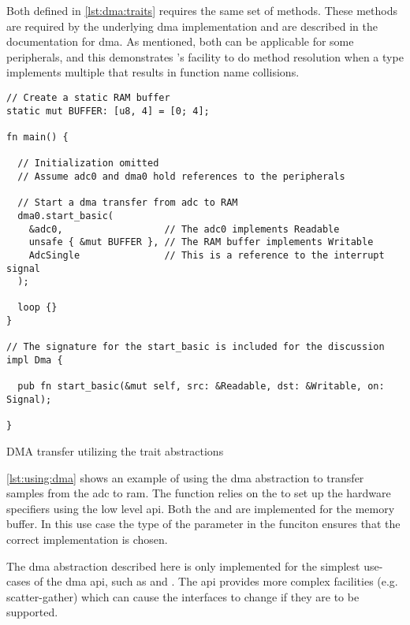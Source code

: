 Both  defined in \autoref{lst:dma:traits} requires the same set of methods.
These methods are required by the underlying \gls{dma} implementation and are described in the {\emlib} documentation for \gls{dma}.
As mentioned, both  can be applicable for some peripherals, and this demonstrates {\rust}'s facility to do method resolution when a type implements multiple  that results in function name collisions.

\begin{listing}[H]
  \begin{verbatim}
// Create a static RAM buffer
static mut BUFFER: [u8, 4] = [0; 4];

fn main() {

  // Initialization omitted
  // Assume adc0 and dma0 hold references to the peripherals

  // Start a dma transfer from adc to RAM
  dma0.start_basic(
    &adc0,                  // The adc0 implements Readable
    unsafe { &mut BUFFER }, // The RAM buffer implements Writable
    AdcSingle               // This is a reference to the interrupt signal
  );

  loop {}
}

// The signature for the start_basic is included for the discussion
impl Dma {

  pub fn start_basic(&mut self, src: &Readable, dst: &Writable, on: Signal);

}
  \end{verbatim}
  \caption{DMA transfer utilizing the trait abstractions}
  \label{lst:using:dma}
\end{listing}

\autoref{lst:using:dma} shows an example of using the \gls{dma} abstraction to transfer samples from the \gls{adc} to \gls{ram}.
The  function relies on the  to set up the hardware specifiers using the low level \gls{api}.
Both the  and   are implemented for the memory buffer.
In this use case the type of the  parameter in the  funciton ensures that the correct implementation is chosen.

The \gls{dma} abstraction described here is only implemented for the simplest use-cases of the {\emlib} \gls{dma} \gls{api}, such as  and .
The {\emlib} \gls{api} provides more complex facilities (e.g. scatter-gather) which can cause the interfaces to change if they are to be supported.
